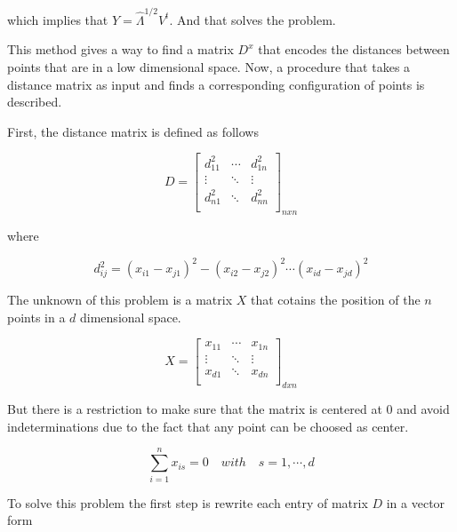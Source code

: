 \documentclass[12pt,journal]{IEEEtran}
\begin{document}
    which implies that $Y = \hat{\Lambda}^{1/2} V^t$. And that solves the problem.

    \vspace{0.25cm}

    This method gives a way to find a matrix $D^x$ that encodes the distances
    between points that are in a low dimensional space. Now, a procedure that
    takes a distance matrix as input and finds a corresponding configuration
    of points is described.

    \vspace{0.25cm}

    First, the distance matrix is defined as follows

    \[
        D =
        \begin{bmatrix}
            d_{11}^2 & \cdots & d_{1n}^2\\
            \vdots   & \ddots & \vdots  \\
            d_{n1}^2 & \ddots & d_{nn}^2\\
        \end{bmatrix}_{n x n}
    \]

    where

    \begin{equation*}
        d_{ij}^2 = (x_{i1}-x_{j1})^2 - (x_{i2}-x_{j2})^2 \cdots (x_{id}-x_{jd})^2
    \end{equation*}

    The unknown of this problem is a matrix $X$ that cotains the position of the
    $n$ points in a $d$ dimensional space.

    \[
        X =
        \begin{bmatrix}
            x_{11} & \cdots & x_{1n}\\
            \vdots & \ddots & \vdots\\
            x_{d1} & \ddots & x_{dn}\\
        \end{bmatrix}_{d x n}
    \]

    But there is a restriction to make sure that the matrix is centered at 0 and
    avoid indeterminations due to the fact that any point can be choosed as center.

    \begin{equation*}
        \sum_{i=1}^n x_{is} = 0 \quad with \quad s = 1, \cdots, d
    \end{equation*}

    To solve this problem the first step is rewrite each entry of matrix $D$ in
    a vector form
\end{document}

